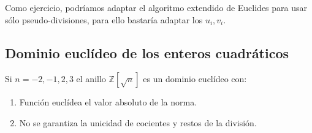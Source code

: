 Como ejercicio, podríamos adaptar el algoritmo extendido de Euclides para usar sólo pseudo-divisiones, para ello bastaría adaptar los $u_i,v_i$. 

\subsection{Dominio euclídeo de los enteros cuadráticos}

\begin{theorem}
	Si $n = -2,-1,2,3$ el anillo $\mathbb{Z}[\sqrt{n}]$ es un dominio euclídeo con:
	
	\begin{enumerate}
	\item Función euclídea el valor absoluto de la norma.
	\item No se garantiza la unicidad de cocientes y restos de la división.  
	\end{enumerate} 
\end{theorem}
